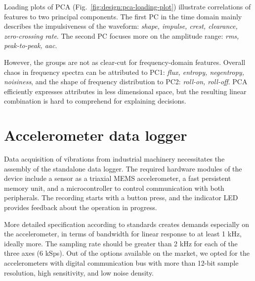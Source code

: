 Loading plots of PCA (Fig.~\ref{fig:design:pca-loading-plot}) illustrate correlations of features to two principal components. The first PC in the time domain mainly describes the impulsiveness of the waveform: \emph{shape, impulse, crest, clearance, zero-crossing rate}. The second PC focuses more on the amplitude range: \emph{rms, peak-to-peak, aac}. 

However, the groups are not as clear-cut for frequency-domain features. Overall chaos in frequency spectra can be attributed to PC1: \emph{flux, entropy, negentropy, noisiness}, and the shape of frequency distribution to PC2: \emph{roll-on, roll-off}. PCA efficiently expresses attributes in less dimensional space, but the resulting linear combination is hard to comprehend for explaining decisions. 

\section{Accelerometer data logger}
Data acquisition of vibrations from industrial machinery necessitates the assembly of the standalone data logger. The required hardware modules of the device include a sensor as a triaxial MEMS accelerometer, a fast persistent memory unit, and a microcontroller to control communication with both peripherals. The recording starts with a button press, and the indicator LED provides feedback about the operation in progress. 

More detailed specification according to standards creates demands especially on the accelerometer, in terms of bandwidth for linear response to at least 1 kHz, ideally more. The sampling rate should be greater than 2 kHz for each of the three axes (6 kSps). Out of the options available on the market, we opted for the accelerometers with digital communication bus with more than 12-bit sample resolution, high sensitivity, and low noise density.

